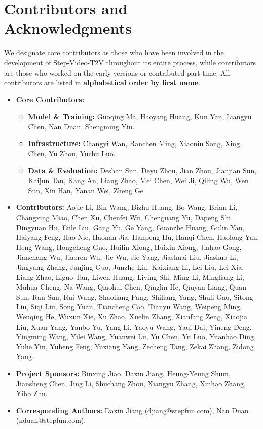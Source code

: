 \newpage
\section*{Contributors and Acknowledgments}\label{team}

We designate core contributors as those who have been involved in the development of Step-Video-T2V throughout its entire process, while contributors are those who worked on the early versions or contributed part-time. All contributors are listed in \textbf{alphabetical order by first name}.

\begin{itemize}[left=0cm] 
\item \textbf{Core Contributors:}
    \begin{itemize}
        \item \textbf{Model \& Training:} Guoqing Ma, Haoyang Huang, Kun Yan, Liangyu Chen, Nan Duan, Shengming Yin.
        \item \textbf{Infrastructure:} Changyi Wan, Ranchen Ming, Xiaoniu Song, Xing Chen, Yu Zhou, Yuchu Luo.
        \item \textbf{Data \& Evaluation:} Deshan Sun, Deyu Zhou, Jian Zhou, Jianjian Sun, Kaijun Tan, Kang An, Liang Zhao, Mei Chen, Wei Ji, Qiling Wu, Wen Sun, Xin Han, Yanan Wei, Zheng Ge.
    \end{itemize}

\item \textbf{Contributors:} Aojie Li, Bin Wang, Bizhu Huang, Bo Wang, Brian Li, Changxing Miao, Chen Xu, Chenfei Wu, Chenguang Yu, Dapeng Shi, Dingyuan Hu, Enle Liu, Gang Yu, Ge Yang, Guanzhe Huang, Gulin Yan, Haiyang Feng, Hao Nie, Haonan Jia, Hanpeng Hu, Hanqi Chen, Haolong Yan, Heng Wang, Hongcheng Guo, Huilin Xiong, Huixin Xiong, Jiahao Gong, Jianchang Wu, Jiaoren Wu, Jie Wu, Jie Yang, Jiashuai Liu, Jiashuo Li, Jingyang Zhang, Junjing Guo, Junzhe Lin, Kaixiang Li, Lei Liu, Lei Xia, Liang Zhao, Liguo Tan, Liwen Huang, Liying Shi, Ming Li, Mingliang Li, Muhua Cheng, Na Wang, Qiaohui Chen, Qinglin He, Qiuyan Liang, Quan Sun, Ran Sun, Rui Wang, Shaoliang Pang, Shiliang Yang, Shuli Gao, Sitong Liu, Siqi Liu, Song Yuan, Tiancheng Cao, Tianyu Wang, Weipeng Ming, Wenqing He, Wuxun Xie, Xu Zhao, Xuelin Zhang, Xianfang Zeng, Xiaojia Liu, Xuan Yang, Yanbo Yu, Yang Li, Yaoyu Wang, Yaqi Dai, Yineng Deng, Yingming Wang, Yilei Wang, Yuanwei Lu, Yu Chen, Yu Luo, Yuanhao Ding, Yuhe Yin, Yuheng Feng, Yuxiang Yang, Zecheng Tang, Zekai Zhang, Zidong Yang.

\item \textbf{Project Sponsors:} Binxing Jiao, Daxin Jiang, Heung-Yeung Shum, Jiansheng Chen, Jing Li, Shuchang Zhou, Xiangyu Zhang, Xinhao Zhang, Yibo Zhu.

\item \textbf{Corresponding Authors:} Daxin Jiang (djiang@stepfun.com), Nan Duan (nduan@stepfun.com).

\end{itemize}
